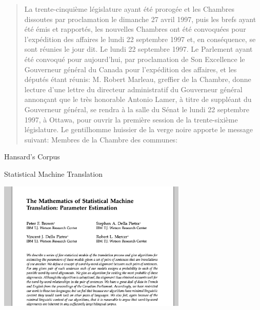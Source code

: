 \documentclass{beamer}
\begin{document}
\begin{frame}
  \begin{small}
  \begin{quote}
    La trente-cinquième législature ayant été prorogée et les Chambres dissoutes par proclamation le dimanche 27 avril 1997, puis les brefs ayant été émis et rapportés, les nouvelles Chambres ont été convoquées pour l'expédition des affaires le lundi 22 septembre 1997 et, en conséquence, se sont réunies le jour dit.  
Le lundi 22 septembre 1997.  
Le Parlement ayant été convoqué pour aujourd'hui, par proclamation de Son Excellence le Gouverneur général du Canada pour l'expédition des affaires, et les députés étant réunis: 
M. Robert Marleau, greffier de la Chambre, donne lecture d'une lettre du directeur administratif du Gouverneur général annonçant que le très honorable Antonio Lamer, à titre de suppléant du Gouverneur général, se rendra à la salle du Sénat le lundi 22 septembre 1997, à Ottawa, pour ouvrir la première session de la trente-sixième législature.  
Le gentilhomme huissier de la verge noire apporte le message suivant: 
Membres de la Chambre des communes: 

  \end{quote}
  \end{small}
\end{frame}

\begin{frame}{Hansard's Corpus}
  
\end{frame}

\begin{frame}{Statistical Machine Translation}
  \begin{center}
    \includegraphics[width=9cm]{mathofmt}
  \end{center}
\end{frame}


{

}
\end{document}
